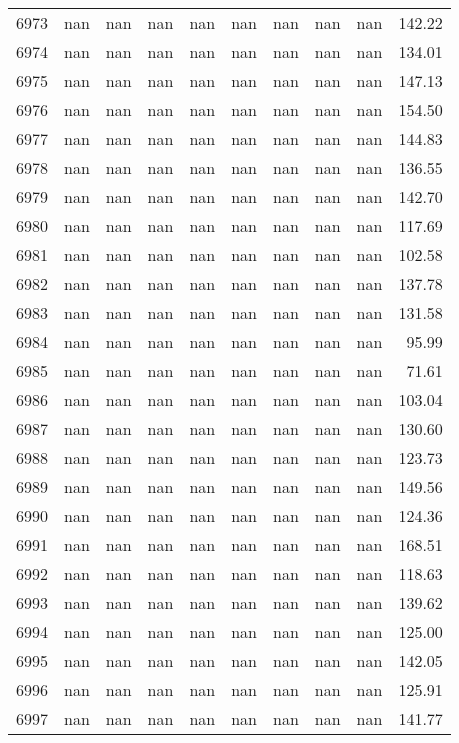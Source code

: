 \begin{tabular}{lrrrrrrrrr}
6973 & nan & nan & nan & nan & nan & nan & nan & nan & 142.22 \\
6974 & nan & nan & nan & nan & nan & nan & nan & nan & 134.01 \\
6975 & nan & nan & nan & nan & nan & nan & nan & nan & 147.13 \\
6976 & nan & nan & nan & nan & nan & nan & nan & nan & 154.50 \\
6977 & nan & nan & nan & nan & nan & nan & nan & nan & 144.83 \\
6978 & nan & nan & nan & nan & nan & nan & nan & nan & 136.55 \\
6979 & nan & nan & nan & nan & nan & nan & nan & nan & 142.70 \\
6980 & nan & nan & nan & nan & nan & nan & nan & nan & 117.69 \\
6981 & nan & nan & nan & nan & nan & nan & nan & nan & 102.58 \\
6982 & nan & nan & nan & nan & nan & nan & nan & nan & 137.78 \\
6983 & nan & nan & nan & nan & nan & nan & nan & nan & 131.58 \\
6984 & nan & nan & nan & nan & nan & nan & nan & nan & 95.99 \\
6985 & nan & nan & nan & nan & nan & nan & nan & nan & 71.61 \\
6986 & nan & nan & nan & nan & nan & nan & nan & nan & 103.04 \\
6987 & nan & nan & nan & nan & nan & nan & nan & nan & 130.60 \\
6988 & nan & nan & nan & nan & nan & nan & nan & nan & 123.73 \\
6989 & nan & nan & nan & nan & nan & nan & nan & nan & 149.56 \\
6990 & nan & nan & nan & nan & nan & nan & nan & nan & 124.36 \\
6991 & nan & nan & nan & nan & nan & nan & nan & nan & 168.51 \\
6992 & nan & nan & nan & nan & nan & nan & nan & nan & 118.63 \\
6993 & nan & nan & nan & nan & nan & nan & nan & nan & 139.62 \\
6994 & nan & nan & nan & nan & nan & nan & nan & nan & 125.00 \\
6995 & nan & nan & nan & nan & nan & nan & nan & nan & 142.05 \\
6996 & nan & nan & nan & nan & nan & nan & nan & nan & 125.91 \\
6997 & nan & nan & nan & nan & nan & nan & nan & nan & 141.77 \\

\end{tabular}
